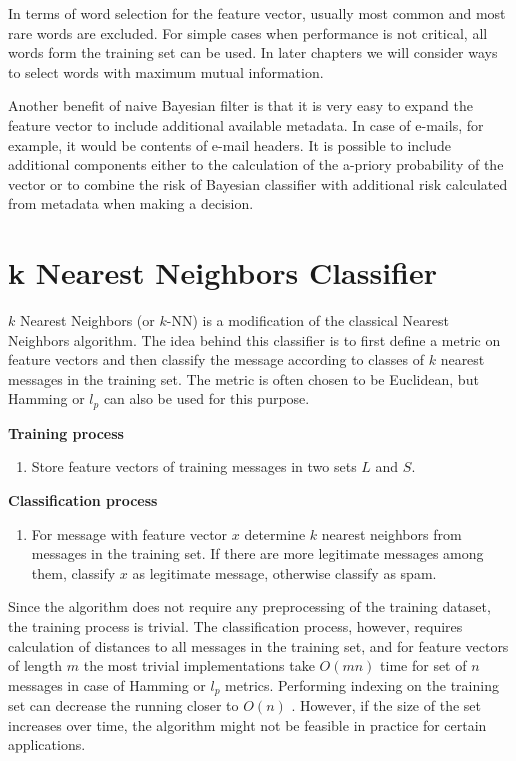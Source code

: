 \documentclass[12pt]{report}
\begin{document}
In terms of word selection for the feature vector, usually most common and most rare words are excluded. For simple cases when performance is not critical, all words form the training set can be used. In later chapters we will consider ways to select words with maximum mutual information.

Another benefit of naive Bayesian filter is that it is very easy to expand the feature vector to include additional available metadata. In case of e-mails, for example, it would be contents of e-mail headers. It is possible to include additional components either to the calculation of the a-priory probability of the vector or to combine the risk of Bayesian classifier with additional risk calculated from metadata when making a decision.

\newpage

\section{k Nearest Neighbors Classifier}

$k$ Nearest Neighbors (or $k$-NN) is a modification of the classical Nearest Neighbors algorithm. The idea behind this classifier is to first define a metric on feature vectors and then classify the message according to classes of $k$ nearest messages in the training set. The metric is often chosen to be Euclidean, but Hamming or $l_p$ can also be used for this purpose.

\textbf{Training process}

\begin{enumerate}
	\item Store feature vectors of training messages in two sets $L$ and $S$.
\end{enumerate}

\textbf{Classification process}

\begin{enumerate}
	\item For message with feature vector $x$ determine $k$ nearest neighbors from messages in the training set. If there are more legitimate messages among them, classify $x$ as legitimate message, otherwise classify as spam.
\end{enumerate}

Since the algorithm does not require any preprocessing of the training dataset, the training process is trivial. The classification process, however, requires calculation of distances to all messages in the training set, and for feature vectors of length $m$ the most trivial implementations take $O(mn)$ time for set of $n$ messages in case of Hamming or $l_p$ metrics. Performing indexing on the training set can decrease the running closer to $O(n)$ \cite{Tretyakov}. However, if the size of the set increases over time, the algorithm might not be feasible in practice for certain applications.
\end{document}
